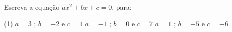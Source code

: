 \begin{question} %
Escreva a equação $ax^2+bx+c=0$, para:

\begin{tasks}(1)
        \task $a=3$ ; $b=-2$ e $c=1$  
        \task $a=-1$ ; $b=0$ e $c=7$  
        \task $a=1$ ; $b=-5$ e $c=-6$  
    \end{tasks}
\end{question}


   